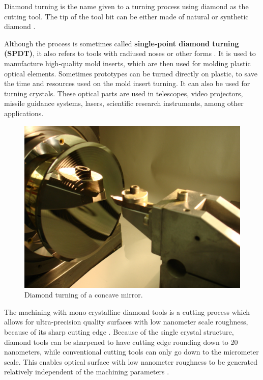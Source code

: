 	Diamond turning is the name given to a turning process using diamond as the cutting tool. The tip of the tool bit can be either made of natural or synthetic diamond \cite{gerchman1986}.
	
	Although the process is sometimes called \textbf{single-point diamond turning (SPDT)}, it also refers to tools with radiused noses or other forms \cite{gerchman1986}. It is used to manufacture high-quality mold inserts, which are then used for molding plastic optical elements. Sometimes prototypes can be turned directly on plastic, to save the time and resources used on the mold insert turning. It can also be used for turning crystals. These optical parts are used in telescopes, video projectors, missile guidance systems, lasers, scientific research instruments, among other applications.\newline
	
	\begin{figure}[H]
		\centering
		\captionsetup{justification=centering}
		\includegraphics[width=0.8\linewidth]{Cap2/Diamondturning/piecewithtool.jpg}
		\caption{Diamond turning of a concave mirror.}
		\label{fig:piecewithtool}
	\end{figure}
	
	The machining with mono crystalline diamond tools is a cutting process which allows for ultra-precision quality surfaces with low nanometer scale roughness, because of its sharp cutting edge \cite{taniguchi1983}. Because of the single crystal structure,  diamond tools can be sharpened to have cutting edge rounding down to 20 nanometers, while conventional cutting tools can only go down to the micrometer scale. This enables optical surface with low nanometer roughness to be generated relatively independent of the machining parameters \cite{cheung2001}.
	

